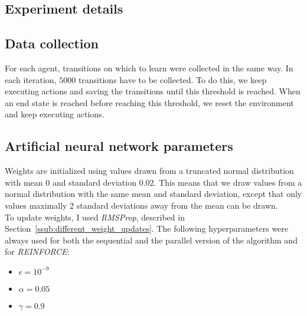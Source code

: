 \begin{appendices}
\chapter{Experiment details}
\section{Data collection} %
\label{sec:data_collection}
For each agent, transitions on which to learn were collected in the same way. In each iteration, $5000$ transitions have to be collected. To do this, we keep executing actions and saving the transitions until this threshold is reached. When an end state is reached before reaching this threshold, we reset the environment and keep executing actions.
\section{Artificial neural network parameters} %
\label{sec:artificial_neural_network_parameters}

Weights are initialized using values drawn from a truncated normal distribution with mean $0$ and standard deviation $0.02$.
This means that we draw values from a normal distribution with the same mean and standard deviation, except that only values maximally 2 standard deviations away from the mean can be drawn.\\
To update weights, I used \textit{RMSProp}, described in Section~\ref{ssub:different_weight_updates}.
The following hyperparameters were always used for both the sequential and the parallel version of the algorithm and for \textit{REINFORCE}:
\begin{itemize}
    \item $\epsilon = 10^{-9}$
    \item $\alpha = 0.05$
    \item $\gamma = 0.9$
\end{itemize}


\end{appendices}
